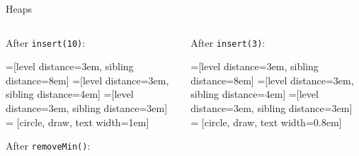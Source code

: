 \documentclass[9pt]{beamer}
\begin{document}
\begin{frame}[fragile]{Heaps}
  \begin{columns}
    \begin{column}{0.5\textwidth}
      After {\tt insert(10)}:
      \vspace{1em}

      =[level distance=3em, sibling distance=8em]
      =[level distance=3em, sibling distance=4em]
      =[level distance=3em, sibling distance=3em]
       = [circle, draw, text width=1em]

       {
      }

      After {\tt removeMin()}:
      \vspace{1em}

       {
      }
    \end{column}
    \begin{column}{0.5\textwidth}
      After {\tt insert(3)}:
      \vspace{1em}

      =[level distance=3em, sibling distance=8em]
      =[level distance=3em, sibling distance=4em]
      =[level distance=3em, sibling distance=3em]
       = [circle, draw, text width=0.8em]


\end{column}
\end{columns}
\end{frame}
\end{document}
